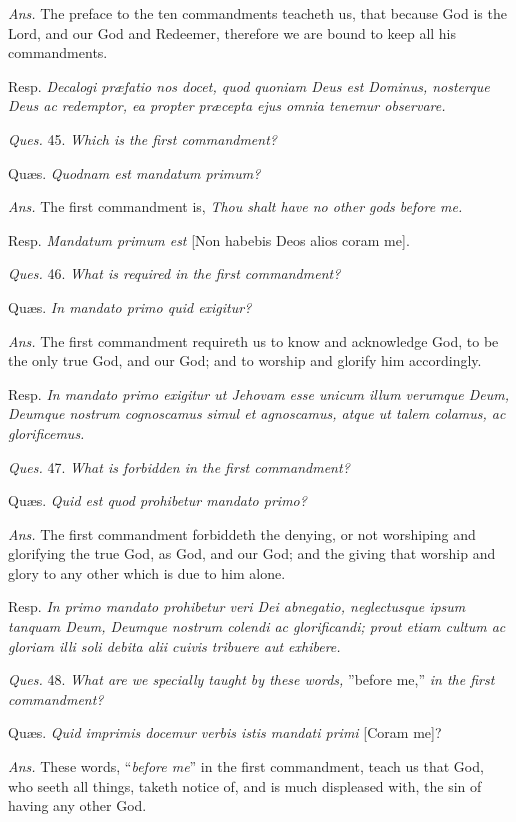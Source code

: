\emph{Ans.} The preface to the ten commandments teacheth us, that because God is the Lord, and our God and Redeemer, therefore we are bound to keep all his commandments.

Resp. \emph{Decalogi præfatio nos docet, quod quoniam Deus est Dominus, nosterque Deus ac redemptor, ea propter præcepta ejus omnia tenemur observare.}

\emph{Ques.} 45. \emph{Which is the first commandment?}

Quæs. \emph{Quodnam est mandatum primum?}

\emph{Ans.} The first commandment is, \emph{Thou shalt have no other gods before me.}

Resp. \emph{Mandatum primum est} [Non habebis Deos alios coram me].

\emph{Ques.} 46. \emph{What is required in the first commandment?}

Quæs. \emph{In mandato primo quid exigitur?}

\emph{Ans.} The first commandment requireth us to know and acknowledge God, to be the only true God, and our God; and to worship and glorify him accordingly.

Resp. \emph{In mandato primo exigitur ut Jehovam esse unicum illum verumque Deum, Deumque nostrum cognoscamus simul et agnoscamus, atque ut talem colamus, ac glorificemus.}

\emph{Ques.} 47. \emph{What is forbidden in the first commandment?}

Quæs. \emph{Quid est quod prohibetur mandato primo?}

\emph{Ans.} The first commandment forbiddeth the denying, or not worshiping and glorifying the true God, as God, and our God; and the giving that worship and glory to any other which is due to him alone.

Resp. \emph{In primo mandato prohibetur veri Dei abnegatio, neglectusque ipsum tanquam Deum, Deumque nostrum colendi ac glorificandi; prout etiam cultum ac gloriam illi soli debita alii cuivis tribuere aut exhibere.}

\emph{Ques.} 48. \emph{What are we specially taught by these words, }''before me,'' \emph{in the first commandment?}

Quæs. \emph{Quid imprimis docemur verbis istis mandati primi} [Coram me]?

\emph{Ans.} These words, ``\emph{before me}'' in the first commandment, teach us that God, who seeth all things, taketh notice of, and is much displeased with, the sin of having any other God.


